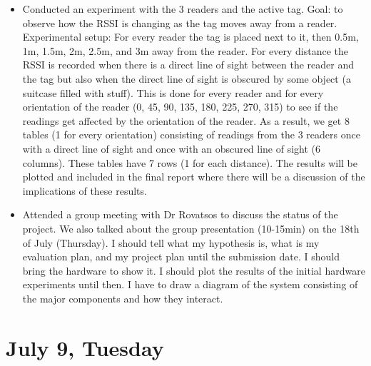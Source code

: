 \documentclass[a4paper,12pt]{article}
\begin{document}
\begin{itemize}
	\item Conducted an experiment with the 3 readers and the active tag. Goal: to observe how the RSSI is changing as the tag moves away from a reader. Experimental setup: For every reader the tag is placed next to it, then 0.5m, 1m, 1.5m, 2m, 2.5m, and 3m away from the reader. For every distance the RSSI is recorded when there is a direct line of sight between the reader and the tag but also when the direct line of sight is obscured by some object (a suitcase filled with stuff). This is done for every reader and for every orientation of the reader (0, 45, 90, 135, 180, 225, 270, 315) to see if the readings get affected by the orientation of the reader. As a result, we get 8 tables (1 for every orientation) consisting of readings from the 3 readers once with a direct line of sight and once with an obscured line of sight (6 columns). These tables have 7 rows (1 for each distance). The results will be plotted and included in the final report where there will be a discussion of the implications of these results.
	\item Attended a group meeting with Dr Rovatsos to discuss the status of the project. We also talked about the group presentation (10-15min) on the 18th of July (Thursday). I should tell what my hypothesis is, what is my evaluation plan, and my project plan until the submission date. I should bring the hardware to show it. I should plot the results of the initial hardware experiments until then. I have to draw a diagram of the system consisting of the major components and how they interact.
\end{itemize}

\section{July 9, Tuesday}
\end{document}
